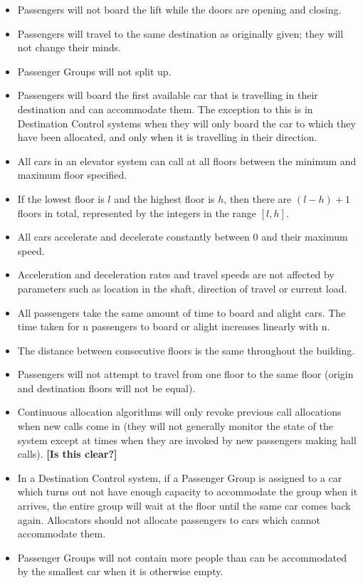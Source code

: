 \documentclass{UoYCSproject}
\begin{document}
	\begin{itemize}
		\item Passengers will not board the lift while the doors are opening and closing.
		\item Passengers will travel to the same destination as originally given; they will not change their minds.
		\item Passenger Groups will not split up.
		\item Passengers will board the first available car that is travelling in their destination and can accommodate them.  The exception to this is in Destination Control systems when they will only board the car to which they have been allocated, and only when it is travelling in their direction.
		\item All cars in an elevator system can call at all floors between the minimum and maximum floor specified.
		\item If the lowest floor is $l$ and the highest floor is $h$, then there are $(l-h)+1$ floors in total, represented by the integers in the range $[l, h]$.
		\item All cars accelerate and decelerate constantly between 0 and their maximum speed.
		\item Acceleration and deceleration rates and travel speeds are not affected by parameters such as location in the shaft, direction of travel or current load.
		\item All passengers take the same amount of time to board and alight cars.  The time taken for n passengers to board or alight increases linearly with n.
		\item The distance between consecutive floors is the same throughout the building.
		\item Passengers will not attempt to travel from one floor to the same floor (origin and destination floors will not be equal).
		\item Continuous allocation algorithms will only revoke previous call allocations when new calls come in (they will not generally monitor the state of the system except at times when they are invoked by new passengers making hall calls). \textbf{[Is this clear?]}
		\item In a Destination Control system, if a Passenger Group is assigned to a car which turns out not have enough capacity to accommodate the group when it arrives, the entire group will wait at the floor until the same car comes back again.  Allocators should not allocate passengers to cars which cannot accommodate them.
		\item Passenger Groups will not contain more people than can be accommodated by the smallest car when it is otherwise empty.
	\end{itemize}
	
\end{document}
